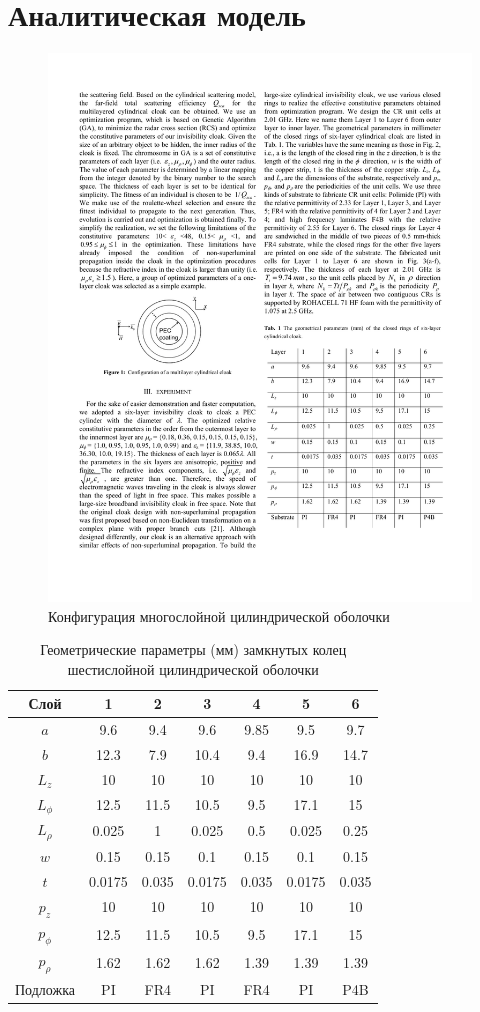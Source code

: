 \documentclass[a4paper, 12pt]{article}
\begin{document}
\section{Аналитическая модель}

\begin{figure}
\begin{centering}
\includegraphics[width=0.5\columnwidth,draft=false]{Fig_1}
\caption{\label{fig:model} Конфигурация многослойной цилиндрической оболочки}
\end{centering}
\end{figure}

\begin{table}[]
\centering
\caption{Геометрические параметры (мм) замкнутых колец шестислойной 
цилиндрической оболочки}
\label{tab:cyl_params}
\begin{tabular}{|c|c|c|c|c|c|c|}
\hline
Слой     & 1      & 2     & 3      & 4     & 5      & 6     \\ \hline
$a$      & 9.6    & 9.4   & 9.6    & 9.85  & 9.5    & 9.7   \\ \hline
$b$      & 12.3   & 7.9   & 10.4   & 9.4   & 16.9   & 14.7  \\ \hline
$L_z$    & 10     & 10    & 10     & 10    & 10     & 10    \\ \hline
$L_\phi$ & 12.5   & 11.5  & 10.5   & 9.5   & 17.1   & 15    \\ \hline
$L_\rho$ & 0.025  & 1     & 0.025  & 0.5   & 0.025  & 0.25  \\ \hline
$w$      & 0.15   & 0.15  & 0.1    & 0.15  & 0.1    & 0.15  \\ \hline
$t$      & 0.0175 & 0.035 & 0.0175 & 0.035 & 0.0175 & 0.035 \\ \hline
$p_z$    & 10     & 10    & 10     & 10    & 10     & 10    \\ \hline
$p_\phi$ & 12.5   & 11.5  & 10.5   & 9.5   & 17.1   & 15    \\ \hline
$p_\rho$ & 1.62   & 1.62  & 1.62   & 1.39  & 1.39   & 1.39  \\ \hline
Подложка & PI     & FR4   & PI     & FR4   & PI     & P4B   \\ \hline
\end{tabular}
\end{table}
\end{document}
